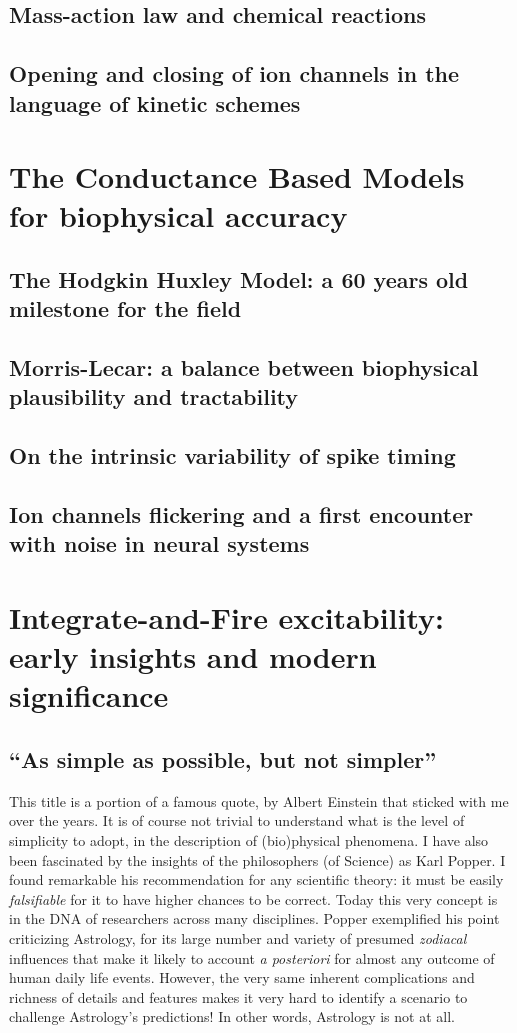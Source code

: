 \subsection{Mass-action law and chemical reactions}
\subsection{Opening and closing of ion channels in the language of kinetic schemes}




\section{The Conductance Based Models for biophysical accuracy}\label{sec3:2}
\subsection{The Hodgkin Huxley Model: a 60 years old milestone for the field}
\subsection{Morris-Lecar: a balance between biophysical plausibility and tractability}
\subsection{On the intrinsic variability of spike timing}
\subsection{Ion channels flickering and a first encounter with noise in neural systems}

\section{Integrate-and-Fire excitability: early insights and modern significance}\label{sec3:3}

\subsection{``As simple as possible, but not simpler''}
This title is a portion of a famous quote, by Albert Einstein that sticked with me over the years. It is of course not trivial to understand what is the level of simplicity to adopt, in the description of (bio)physical phenomena. I have also been fascinated by the insights of the philosophers (of Science) as Karl Popper. I found remarkable his recommendation for any scientific theory: it must be easily \textit{falsifiable} for it  to have higher chances to be correct. Today this very concept is in the DNA of researchers across many disciplines. Popper exemplified his point criticizing Astrology, for its large number and variety of presumed \textit{zodiacal} influences that make it likely to account \textit{a posteriori} for almost any outcome of human daily life events. However, the very same inherent complications and richness of details and features makes it very hard to identify a scenario to challenge Astrology's predictions! In other words, Astrology is not  at all.

